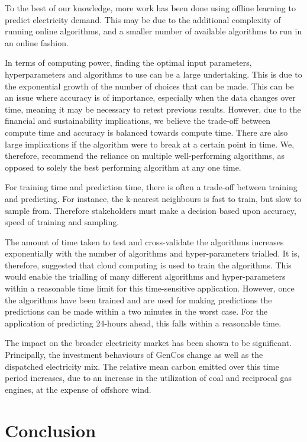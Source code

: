 \documentclass[final,3p,times,twocolumn,numbers]{elsarticle}
\begin{document}
To the best of our knowledge, more work has been done using offline learning to predict electricity demand. This may be due to the additional complexity of running online algorithms, and a smaller number of available algorithms to run in an online fashion.

In terms of computing power, finding the optimal input parameters, hyperparameters and algorithms to use can be a large undertaking. This is due to the exponential growth of the number of choices that can be made. This can be an issue where accuracy is of importance, especially when the data changes over time, meaning it may be necessary to retest previous results. However, due to the financial and sustainability implications, we believe the trade-off between compute time and accuracy is balanced towards compute time. There are also large implications if the algorithm were to break at a certain point in time. We, therefore, recommend the reliance on multiple well-performing algorithms, as opposed to solely the best performing algorithm at any one time. 

For training time and prediction time, there is often a trade-off between training and predicting. For instance, the k-nearest neighbours is fast to train, but slow to sample from. Therefore stakeholders must make a decision based upon accuracy, speed of training and sampling. 

The amount of time taken to test and cross-validate the algorithms increases exponentially with the number of algorithms and hyper-parameters trialled. It is, therefore, suggested that cloud computing is used to train the algorithms. This would enable the trialling of many different algorithms and hyper-parameters within a reasonable time limit for this time-sensitive application. However, once the algorithms have been trained and are used for making predictions the predictions can be made within a two minutes in the worst case. For the application of predicting 24-hours ahead, this falls within a reasonable time.

The impact on the broader electricity market has been shown to be significant. Principally, the investment behaviours of GenCos change as well as the dispatched electricity mix. The relative mean carbon emitted over this time period increases, due to an increase in the utilization of coal and reciprocal gas engines, at the expense of offshore wind.




\section{Conclusion}
\label{sec:conclusion}
\end{document}
